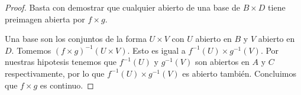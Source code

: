 \documentclass[letter,twoside,11pt]{article}
\begin{document}
\begin{enumerate}
\begin{proof}
Basta con demostrar que cualquier abierto de una base de $B \times D$ tiene preimagen abierta por $f \times g$.

Una base son los conjuntos de la forma $U \times V$ con $U$ abierto en $B$ y $V$ abierto en $D$. Tomemos $(f \times g)^{-1}(U \times V)$. Esto es igual a $ f^{-1}(U) \times g^{-1}(V) $. Por nuestras hipotesis tenemos que $f^{-1}(U)$ y $g^{-1}(V)$ son abiertos en $A$ y $C$ respectivamente, por lo que  $ f^{-1}(U) \times g^{-1}(V) $ es abierto tambi\'en. Concluimos que $f \times g$ es continuo. 
\end{proof}  
\end{enumerate}
\end{document}

